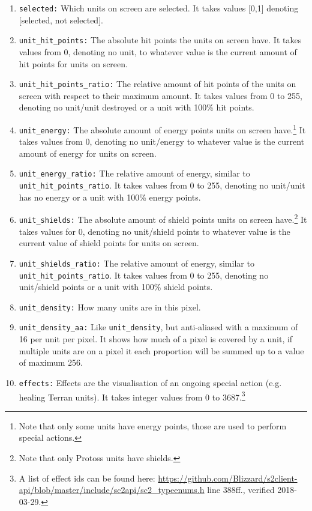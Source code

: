 \documentclass{article}
\begin{document}
\begin{enumerate}[noitemsep,start=0]
an integer from 0 to 894.\footnote{A list of unit ids can be found here: 
\url{https://github.com/Blizzard/s2client-api/blob/master/include/sc2api/sc2_typeenums.h}
 line 25ff., verified 2017-11-29.}
\item \texttt{selected:} Which units on screen are selected. It takes values 
[0,1] denoting [selected, not selected].
\item \texttt{unit\_hit\_points:} The absolute hit points the units on screen 
have. It takes values from 0, denoting no unit, to whatever value is the 
current amount of hit points for units on screen.
\item \texttt{unit\_hit\_points\_ratio:} The relative amount of hit points of 
the units on screen with respect to their maximum amount. It takes values from 
0 to 255, denoting no unit/unit destroyed or a unit with 100\% hit points.
\item \texttt{unit\_energy:} The absolute amount of energy points units on 
screen have.\footnote{Note that only some units have energy points, those are 
used to perform special actions.} It takes values from 0, denoting no 
unit/energy to whatever value is the current amount of energy for units on 
screen.
\item \texttt{unit\_energy\_ratio:} The relative amount of energy, similar to 
\texttt{unit\_hit\_points\_ratio}. It takes values from 0 to 255, denoting no 
unit/unit has no energy or a unit with 100\% energy points.
\item \texttt{unit\_shields:} The absolute amount of shield points units on 
screen have.\footnote{Note that only Protoss units have shields.} It takes 
values for 0, denoting no unit/shield points to whatever value is the current 
value of shield points for units on screen.
\item \texttt{unit\_shields\_ratio:} The relative amount of energy, similar to 
\texttt{unit\_hit\_points\_ratio}. It takes values from 0 to 255, denoting no 
unit/shield points or a unit with 100\% shield points.
\item \texttt{unit\_density:} How many units are in this pixel.
\item \texttt{unit\_density\_aa:} Like \texttt{unit\_density}, but anti-aliased 
with a maximum of 16 per unit per pixel. It shows how much of a pixel is 
covered by a unit, if multiple units are on a pixel it each proportion will be 
summed up to a value of maximum 256.
\item \texttt{effects:} Effects are the visualisation of an ongoing special 
action (e.g. healing Terran units). It takes integer values from 0 to 
3687.\footnote{A list of effect ids can be found here: 
\url{https://github.com/Blizzard/s2client-api/blob/master/include/sc2api/sc2_typeenums.h}
 line 388ff., verified 2018-03-29.}
\end{enumerate}
\end{document}
